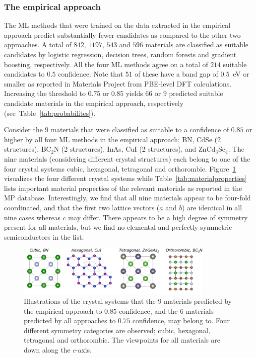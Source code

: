\documentclass[superscriptaddress,unsortedaddress,
 amsmath,amssymb,
 aps,
]{revtex4-2}
\begin{document}
\subsubsection*{The empirical approach}
The ML methods that were trained on the data extracted in the empirical approach predict substantially fewer candidates as compared to the other two approaches. 
A total of $842$, $1197$, $543$ and $596$ materials are classified as suitable candidates by logistic regression, decision trees, random forests and gradient boosting, respectively. All the four ML methods agree on a total of $214$ suitable candidates to $0.5$ confidence.   
Note that $51$ of these have a band gap of $0.5$~eV or smaller as reported in Materials Project from PBE-level DFT calculations. Increasing the threshold to $0.75$ or $0.85$ yields $66$ or $9$ predicted suitable candidate materials in the empirical approach, respectively (see~Table~\ref{tab:probabilites}). 

Consider the $9$ materials that were classified as suitable to a confidence of $0.85$ or higher by all four ML methods in the empirical approach; BN, CdSe (2 structures), BC$_2$N (2 structures), InAs, CuI (2 structures), and ZnCd$_3$Se$_4$. 
The nine materials (considering different crystal structures) each belong to one of the four crystal systems cubic, hexagonal, tetragonal and orthorombic. Figure~\ref{fig:crystalsystems} visualizes the four different crystal systems while Table~\ref{tab:materialproperties} lists important material properties of the relevant materials as reported in the MP database.  Interestingly, we find that all nine materials appear to be four-fold coordinated, and that the first two lattice vectors ($a$ and $b$) are identical in all nine cases whereas $c$ may differ.  
There appears to be a high degree of symmetry present for all materials, but we find no elemental and perfectly symmetric semiconductors in the list. 

\begin{figure}[t]
    \centering
    \includegraphics[width=0.85\textwidth]{figures/vesta-images/fig6-all.png}
    \caption{Illustrations of the crystal systems that the $9$ materials predicted by the empirical approach to $0.85$ confidence, and the $6$ materials predicted by all approaches to $0.75$ confidence, may belong to. Four different symmetry categories are observed; cubic, hexagonal, tetragonal and orthorombic. The viewpoints for all materials are down along the $c$-axis.   }
    \label{fig:crystalsystems}
\end{figure}
\end{document}
